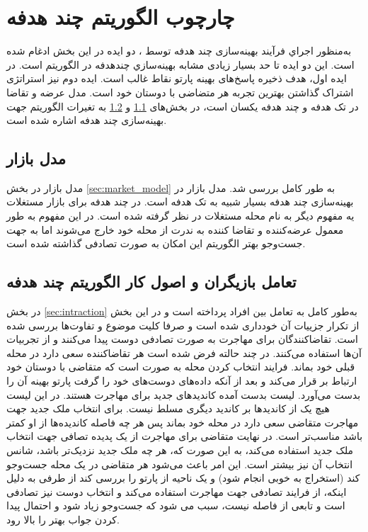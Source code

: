 \section{چارچوب الگوریتم چند هدفه }
به‌منظور اجراي فرآيند بهينه‌سازی چند هدفه توسط ، دو ايده در اين بخش ادغام شده است. اين دو ايده تا حد بسيار زيادی مشابه بهينه‌سازي چندهدفه در الگوريتم  است. در ايده اول، هدف ذخیره پاسخ‌های بهينه پارتو نقاط غالب است. ايده دوم نيز استراتژی اشتراک گذاشتن بهترین تجربه هر متضاضی با دوستان خود است. مدل عرضه و تقاضا در تک هدفه و چند هدفه یکسان است، در بخش‌های
\ref{sec:market_model_multi}
و 
\ref{sec:intraction_multi}
به تغیرات الگوریتم جهت بهینه‌سازی چند هدفه اشاره شده است.



\subsection{مدل بازار}\label{sec:market_model_multi}

مدل بازار در بخش
\ref{sec:market_model}
به طور کامل بررسی شد. مدل بازار در بهینه‌سازی چند هدفه بسیار شبیه به تک هدفه است. در چند هدفه برای بازار مستغلات یه مفهوم دیگر به نام محله مستغلات در نظر گرفته شده است. در این مفهوم به طور معمول عرضه‌کننده و تقاضا کننده به ندرت از محله خود خارج می‌شوند اما به جهت جست‌و‌جو بهتر الگوریتم این امکان به صورت تصادفی گذاشته شده است.

\subsection{تعامل بازیگران و اصول کار الگوریتم چند هدفه}\label{sec:intraction_multi}
 در بخش \ref{sec:intraction}
به‌طور کامل به تعامل بین افراد پرداخته است و در این بخش از تکرار جزییات آن خودداری شده است و صرفا کلیت موضوع و تفاوت‌ها بررسی شده است.
 تقاضا‌کنندگان برای مهاجرت به صورت تصادفی دوست پیدا می‌کنند و از تجربیات آن‌ها استفاده می‌کنند. در چند حالته فرض شده است هر تقاضاکننده سعی دارد در محله قبلی خود بماند. فرایند انتخاب کردن محله به صورت است که متقاضی با دوستان خود ارتباط بر قرار می‌کند و بعد از آنکه داده‌های دوست‌های خود را گرفت پارتو بهینه آن را بدست می‌آورد. لیست بدست آمده کاندیدهای جدید برای مهاجرت هستند. در این لیست هیچ یک از کاندیدها بر کاندید دیگری مسلط نیست. برای انتخاب ملک جدید جهت مهاجرت متقاضی سعی دارد در محله خود بماند پس هر چه فاصله‌ کاندید‌‌ه‌ها از او کمتر باشد مناسب‌تر است. در نهایت متقاضی برای مهاجرت از یک پدیده تصافی جهت انتخاب ملک جدید استفاده می‌کند، به این صورت که، هر چه ملک جدید نزدیک‌تر باشد، شانس انتخاب آن نیز بیشتر است. این امر باعث می‌شود هر متقاضی در یک محله جست‌وجو کند (استخراج به خوبی انجام شود) و یک ناحیه از پارتو را بررسی کند از طرفی به دلیل اینکه، از فرایند تصادفی جهت مهاجرت استفاده می‌کند و انتخاب دوست نیز تصادفی است و تابعی از فاصله نیست، سبب می شود که جست‌و‌جو زیاد شود و احتمال پیدا کردن جواب بهتر را بالا رود.
 
